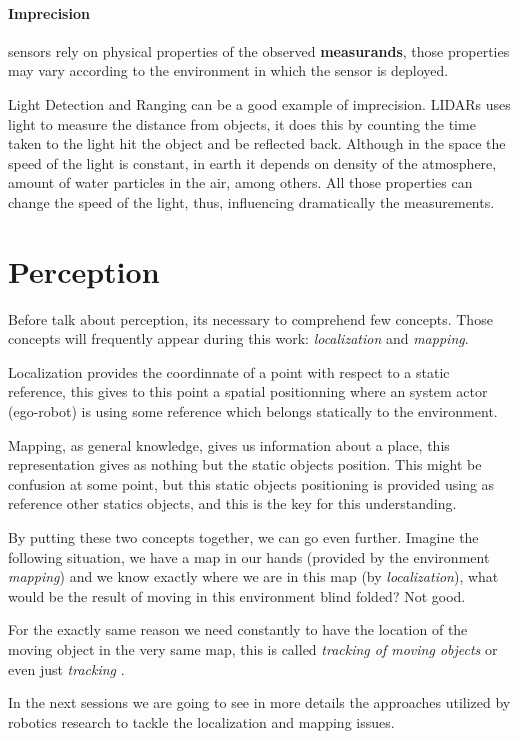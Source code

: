 \paragraph{Imprecision} sensors rely on physical properties of the observed \textbf{measurands}, those properties may vary according to the environment in which the sensor is deployed.

Light Detection and Ranging can be a good example of imprecision. LIDARs uses light to measure the distance from objects, it does this by counting the time taken to the light hit the object and be reflected back. Although in the space the speed of the light is constant, in earth it depends on density of the atmosphere, amount of water particles in the air, among others. All those properties can change the speed of the light, thus, influencing dramatically the measurements.

\section{Perception}

Before talk about perception, its necessary to comprehend few concepts. Those concepts will frequently appear during this work: \textit{localization} and \textit{mapping}.

Localization provides the coordinnate of a point with respect to a static reference, this gives to this point a spatial positionning where an system actor (ego-robot) is using some reference which belongs statically to the environment.  

Mapping, as general knowledge, gives us information about a place, this representation gives as nothing but the static objects position. This might be confusion at some point, but this static objects positioning is provided using as reference other statics objects, and this is the key for this understanding.

By putting these two concepts together, we can go even further. Imagine the following situation, we have a map in our hands (provided by the environment \textit{mapping}) and we know exactly where we are in this map (by \textit{localization}), what would be the result of moving in this environment blind folded? Not good.

For the exactly same reason we need constantly to have the location of the moving object in the very same map, this is called \textit{tracking of moving objects} or even just \textit{tracking} \cite{Wang04a}.

In the next sessions we are going to see in more details the approaches utilized by robotics research to tackle the localization and mapping issues.

